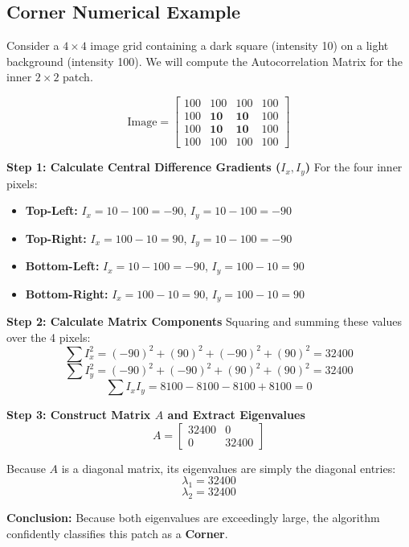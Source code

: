 \documentclass{report}
\begin{document}
\subsection{Corner Numerical Example}
Consider a $4 \times 4$ image grid containing a dark square (intensity 10) on a light background (intensity 100). We will compute the Autocorrelation Matrix for the inner $2 \times 2$ patch.

\[ \text{Image} = \begin{bmatrix} 100 & 100 & 100 & 100 \\ 100 & \textbf{10} & \textbf{10} & 100 \\ 100 & \textbf{10} & \textbf{10} & 100 \\ 100 & 100 & 100 & 100 \end{bmatrix} \]

\textbf{Step 1: Calculate Central Difference Gradients ($I_x, I_y$)}
For the four inner pixels:
\begin{itemize}
    \item \textbf{Top-Left:} $I_x = 10 - 100 = -90$, $I_y = 10 - 100 = -90$
    \item \textbf{Top-Right:} $I_x = 100 - 10 = 90$, $I_y = 10 - 100 = -90$
    \item \textbf{Bottom-Left:} $I_x = 10 - 100 = -90$, $I_y = 100 - 10 = 90$
    \item \textbf{Bottom-Right:} $I_x = 100 - 10 = 90$, $I_y = 100 - 10 = 90$
\end{itemize}

\textbf{Step 2: Calculate Matrix Components}
Squaring and summing these values over the 4 pixels:
\[ \sum I_x^2 = (-90)^2 + (90)^2 + (-90)^2 + (90)^2 = 32400 \]
\[ \sum I_y^2 = (-90)^2 + (-90)^2 + (90)^2 + (90)^2 = 32400 \]
\[ \sum I_x I_y = 8100 - 8100 - 8100 + 8100 = 0 \]

\textbf{Step 3: Construct Matrix $A$ and Extract Eigenvalues}
\[ A = \begin{bmatrix} 32400 & 0 \\ 0 & 32400 \end{bmatrix} \]

Because $A$ is a diagonal matrix, its eigenvalues are simply the diagonal entries:
\[ \lambda_1 = 32400 \]
\[ \lambda_2 = 32400 \]

\textbf{Conclusion:} Because both eigenvalues are exceedingly large, the algorithm confidently classifies this patch as a \textbf{Corner}.
\end{document}
